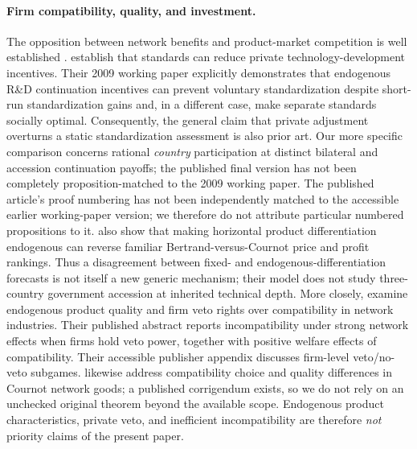\paragraph{Firm compatibility, quality, and investment.}
The opposition between network benefits and product-market
competition is well established \citep{EconomidesFlyer1998,
EconomidesSkrzypacz2003}.
\citet{CabralSalant2014} establish that standards can reduce
private technology-development incentives. Their
2009 working paper explicitly demonstrates that
endogenous R\&D continuation incentives can
prevent voluntary standardization despite short-run
standardization gains and, in a different case,
make separate standards socially optimal.
Consequently, the general claim that private
adjustment overturns a static standardization
assessment is also prior art. Our more specific
comparison concerns rational \emph{country}
participation at distinct bilateral and accession
continuation payoffs; the published final version
has not been completely proposition-matched
to the 2009 working paper. The published
article's proof numbering has not been independently
matched to the accessible earlier working-paper version;
we therefore do not attribute particular numbered
propositions to it.
\citet{BranderSpencer2022} also show that making
horizontal product differentiation endogenous can
reverse familiar Bertrand-versus-Cournot price and
profit rankings. Thus a disagreement between
fixed- and endogenous-differentiation forecasts
is not itself a new generic mechanism; their model
does not study three-country government accession
at inherited technical depth.
More closely, \citet{ChengHuang2025} examine endogenous
product quality and firm veto rights over compatibility in
network industries. Their published abstract reports
incompatibility under strong network effects when firms
hold veto power, together with positive welfare effects
of compatibility. Their accessible publisher appendix
discusses firm-level veto/no-veto subgames.
\citet{BuccellaFantiGori2024} likewise address
compatibility choice and quality differences in Cournot
network goods; a published corrigendum exists, so we
do not rely on an unchecked original theorem beyond
the available scope. Endogenous product characteristics,
private veto, and inefficient incompatibility are
therefore \emph{not} priority claims of the present paper.

